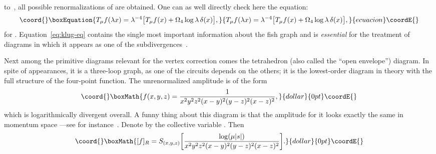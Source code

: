 \documentclass[a4paper,12pt]{article}
\providecommand{\dl}{\delta}           %
\providecommand{\F}{\mathcal{F}}       %
\providecommand{\la}{\lambda}          %
\providecommand{\prim}{{\mathrm{prim}}} %
\providecommand{\R}{\mathbb{R}}        %
\providecommand{\7}{\dagger}           %
\theoremstyle{plain}
\theoremstyle{definition}
\begin{document}
to~\myHighlight{$\infty$}\coordHE{}, all possible renormalizations of \coordHE{} are obtained.
One can as well directly check here the equation:
\begin{equation}\coord{}\boxEquation{
T_\mu f(\la x) =
\la^{-4} \bigl[ T_\mu f(x) + \Omega_4 \log\la\,\dl(x) \bigr],
\label{eq:klug-eq}
}{
T_\mu f(\la x) =
\la^{-4} \bigl[ T_\mu f(x) + \Omega_4 \log\la\,\dl(x) \bigr],
}{ecuacion}\coordE{}\end{equation}
for \coordHE{}. Equation~\eqref{eq:klug-eq} contains the single
most important information about the fish graph and is
\textit{essential} for the treatment of diagrams in which it appears
as one of the subdivergences~\cite{Flora}.

Next among the primitive diagrams relevant for the vertex correction
comes the tetrahedron (also called the ``open envelope'') diagram. In
spite of appearances, it is a three-loop graph, as one of the circuits
depends on the others; it is the lowest-order diagram in \coordHE{}
theory with the full structure of the four-point function. The
unrenormalized amplitude \myHighlight{$f \in \F_\prim(\R^{12})$}\coordHE{} is of the form
$$\coord{}\boxMath{
f(x,y,z) = \frac{1}{x^2 y^2 z^2 (x-y)^2 (y-z)^2 (x-z)^2},
}{dollar}{0pt}\coordE{}$$
which is logarithmically divergent overall. A funny thing about this
diagram is that the amplitude for it looks exactly the same in
momentum space ---see for instance~\cite{Dirkbook}. Denote by \coordHE{} the
collective variable \coordHE{}. Then
$$\coord{}\boxMath{
[f]_R = S_{(x,y,z)} \biggl[
\frac{\log(\mu|s|)}{x^2 y^2 z^2 (x-y)^2 (y-z)^2 (x-z)^2} \biggr].
}{dollar}{0pt}\coordE{}$$
\end{document}
